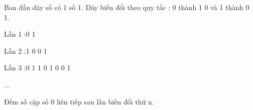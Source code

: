 Ban đầu dãy số có 1 số 1. Dãy biến đổi theo quy tắc : 0 thành 1 0 và 1 thành 0 1.

Lần 1 :0 1

Lần 2 :1 0 0 1

Lần 3 :0 1 1 0 1 0 0 1

...

Đếm số cặp số 0 liên tiếp sau lần biến đổi thứ n.